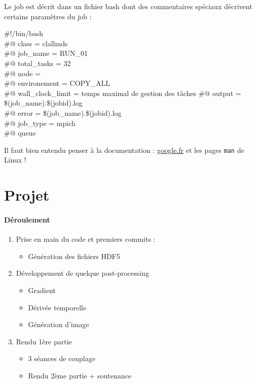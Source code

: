 \documentclass{article}
\begin{document}
Le job est décrit dans un fichier bash dont des commentaires spéciaux décrivent certains paramètres du job :\\
\begin{algorithm}[H]
\#!/bin/bash\\
\#@ class = clallmds\\
\#@ job\_name = RUN\_01\\
\#@ total\_tasks = 32\\
\#@ node = \\
\#@ environement = COPY\_ALL\\
\#@ wall\_clock\_limit = temps maximal de gestion des tâches 
\#@ output = \$(job\_name).\$(jobid).log\\
\#@ error = \$(job\_name).\$(jobid).log\\
\#@ job\_type = mpich\\
\#@ queue 
\end{algorithm}

Il faut bien entendu penser à la documentation : \url{google.fr} et les pages \texttt{man} de Linux !

\section{Projet}
\paragraph{Déroulement}
\begin{enumerate}
\item Prise en main du code et premiers commits :
\begin{itemize}
\item Génération des fichiers HDF5
\end{itemize}
\item Développement de quelque post-processing
\begin{itemize}
\item Gradient
\item Dérivée temporelle
\item Génération d'image
\end{itemize}
\item Rendu 1ère partie
\begin{itemize}
\item 3 séances de couplage
\item Rendu 2ème partie + soutenance
\end{itemize}
\end{enumerate}
\end{document}
